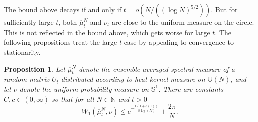 \documentclass[11pt]{article}
\newtheorem{prop}[theo]{Proposition}
\theoremstyle{definition}
\numberwithin{equation}{section}
\numberwithin{figure}{section}
\numberwithin{table}{section}
\newcommand{\Unitary}[1]{\mathbb{U}\left(#1\right)}
\newcommand{\Circle}{\mathbb{S}^1}
\begin{document}
The bound above decays if and only if $t=o(N/((\log N)^{5/2}))$. But for sufficiently large $t$, both $\overline{\mu}^N_t$ and $\nu_t$ are close to the uniform measure on the circle. This is not reflected in the bound above, which gets worse for large $t$. The following propositions treat the large $t$ case by appealing to convergence to stationarity.

\begin{prop}\label{T:avg-to-uniform}
Let $\overline{\mu}^N_t$ denote the ensemble-averaged spectral measure of a random matrix $U_t$ distributed according to heat kernel measure on $\Unitary{N}$, and let $\nu$ denote the uniform probability measure on $\Circle$. There are constants $C,c\in(0,\infty)$ so that for all $N\in\mathbb{N}$ and $t>0$
\[
W_1(\overline{\mu}^N_t,\nu)\le e^{-\frac{t(1+o(1))}{8\log(N)}}+\frac{2\pi}{N}.
\]
\end{prop}
\end{document}
